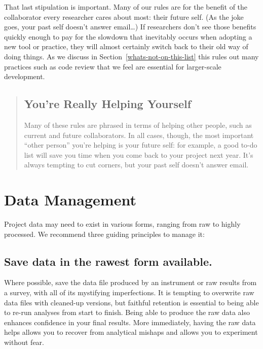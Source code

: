 \documentclass[10pt]{article}
\begin{document}
That last stipulation is important. Many of our rules are for the
benefit of the collaborator every researcher cares about most: their
future self. (As the joke goes, your past self doesn't answer
email{\ldots}) If researchers don't see those benefits quickly enough to
pay for the slowdown that inevitably occurs when adopting a new tool or
practice, they will almost certainly switch back to their old way of
doing things. As we discuss in Section~\ref{whats-not-on-this-list}
this rules out many practices such as code review that we feel are
essential for larger-scale development.

\begin{quote}
\subsection*{You're Really Helping Yourself}\label{youre-really-helping-yourself}

Many of these rules are phrased in terms of helping other people, such
as current and future collaborators. In all cases, though, the most
important ``other person'' you're helping is your future self: for
example, a good to-do list will save you time when you come back to your
project next year. It's always tempting to cut corners, but your past
self doesn't answer email.
\end{quote}

\section{Data Management}\label{data-management}

Project data may need to exist in various forms, ranging from raw to
highly processed. We recommend three guiding principles to manage it:

\subsection*{Save data in the rawest form available.}

Where possible, save the data file produced by an instrument or raw
results from a survey, with all of its mystifying imperfections. It is
tempting to overwrite raw data files with cleaned-up versions, but
faithful retention is essential to being able to re-run analyses from
start to finish. Being able to produce the raw data also enhances
confidence in your final results. More immediately, having the raw data
helps allows you to recover from analytical mishaps and allows you to
experiment without fear.
\end{document}
